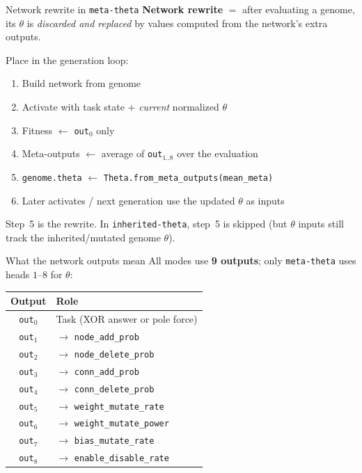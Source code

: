 \documentclass[aspectratio=169,11pt]{beamer}
\begin{document}
\begin{frame}{Network rewrite in \texttt{meta-theta}}
  \textbf{Network rewrite} $=$ after evaluating a genome, its $\theta$ is
  \emph{discarded and replaced} by values computed from the network's extra outputs.

  \vspace{0.6em}
  Place in the generation loop:
  \begin{enumerate}
    \item Build network from genome
    \item Activate with task state $+$ \emph{current} normalized $\theta$
    \item Fitness $\leftarrow$ \texttt{out}$_0$ only
    \item Meta-outputs $\leftarrow$ average of \texttt{out}$_{1..8}$ over the evaluation
    \item \alert{\texttt{genome.theta} $\leftarrow$ \texttt{Theta.from\_meta\_outputs(mean\_meta)}}
    \item Later activates / next generation use the updated $\theta$ as inputs
  \end{enumerate}

  \vspace{0.4em}
  Step~5 is the rewrite. In \texttt{inherited-theta}, step~5 is skipped
  (but $\theta$ inputs still track the inherited/mutated genome $\theta$).
\end{frame}

\begin{frame}{What the network outputs mean}
  All modes use \textbf{9 outputs}; only \texttt{meta-theta} uses heads $1$--$8$ for $\theta$:

  \vspace{0.4em}
  \begin{tabular}{cl}
    \toprule
    Output & Role \\
    \midrule
    \texttt{out}$_0$ & Task (XOR answer or pole force) \\
    \texttt{out}$_1$ & $\rightarrow$ \texttt{node\_add\_prob} \\
    \texttt{out}$_2$ & $\rightarrow$ \texttt{node\_delete\_prob} \\
    \texttt{out}$_3$ & $\rightarrow$ \texttt{conn\_add\_prob} \\
    \texttt{out}$_4$ & $\rightarrow$ \texttt{conn\_delete\_prob} \\
    \texttt{out}$_5$ & $\rightarrow$ \texttt{weight\_mutate\_rate} \\
    \texttt{out}$_6$ & $\rightarrow$ \texttt{weight\_mutate\_power} \\
    \texttt{out}$_7$ & $\rightarrow$ \texttt{bias\_mutate\_rate} \\
    \texttt{out}$_8$ & $\rightarrow$ \texttt{enable\_disable\_rate} \\
    \bottomrule
  \end{tabular}
\end{frame}
\end{document}
